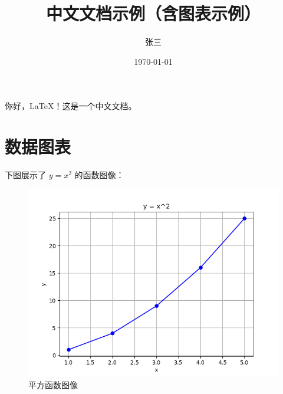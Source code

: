 \documentclass{ctexart}
\title{中文文档示例（含图表示例）}
\author{张三}
\date{\today}
\begin{document}
\maketitle

你好，\LaTeX！这是一个中文文档。

\section{数据图表}
下图展示了 $ y = x^2 $ 的函数图像：

\begin{figure}[htbp]
  \centering
  \includegraphics[width=0.8\linewidth]{plot-data.png}
  \caption{平方函数图像}
  \label{fig:plot}
\end{figure}
\end{document}
